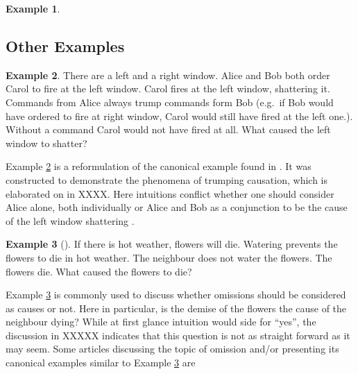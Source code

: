\documentclass[11pt,a4paper]{book}
\theoremstyle{definition}
\theoremstyle{definition}
\newtheorem{example}{Example}[section]
\theoremstyle{definition}
\theoremstyle{remark}
\begin{document}
\begin{example}
\begin{center}
\end{center}

\end{example}



\subsection{Other Examples}

\begin{example}
\label{ex:trumping-1}
There are a left and a right window.
Alice and Bob both order Carol to fire at the left window. Carol fires at the left window, shattering it. 
Commands from Alice always trump commands form Bob (e.g.\ if Bob would have ordered to fire at right window, Carol would still have fired at the left one.). 
Without a command Carol would not have fired at all.
What caused the left window to shatter?
\end{example}
Example \ref{ex:trumping-1} is a reformulation of the canonical example found in \parencite{halpern2011actual,weslake2015partial}.  
It was constructed to demonstrate the phenomena of trumping causation, which is elaborated on in XXXX.
Here intuitions conflict whether one should consider Alice alone, both individually or Alice and Bob as a conjunction to be the cause of the left window shattering \parencite{halpern2011actual,weslake2015partial}.




\begin{example}[\cite{halpern2015graded}]
\label{ex:omission-1}
If there is hot weather, flowers will die. Watering prevents the flowers to die in hot weather. The neighbour does not water the flowers. 
The flowers die. What caused the flowers to die?
\end{example}

Example \ref{ex:omission-1} is commonly used to discuss whether omissions should be considered as causes or not.
Here in particular, is the demise of the flowers the cause of the neighbour dying? While at first glance intuition would side for ``yes'', the discussion in XXXXX indicates that this question is not as straight forward as it may seem.
Some articles discussing the topic of omission and/or presenting its canonical examples similar to Example  \ref{ex:omission-1} are \parencite{glymour2010actual,halpern2011actual,halpern2015graded,blanchard2017cause}
\end{document}
